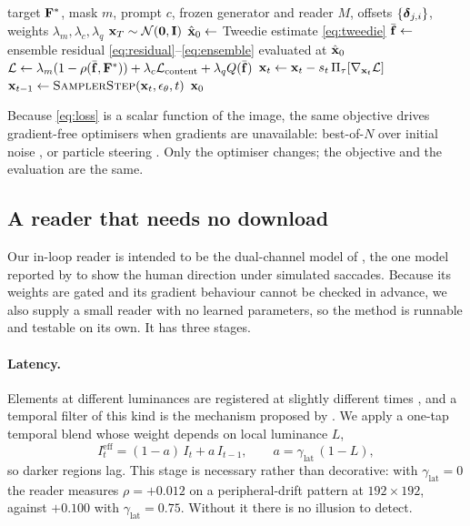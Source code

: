 \begin{algorithm}[t]
\caption{Jitter-ensemble motion guidance (one sample)}
\label{alg:main}
\begin{algorithmic}[1]
\Require target $\mathbf{F}^\ast$, mask $m$, prompt $c$, frozen generator and reader
         $M$, offsets $\{\boldsymbol{\delta}_{j,i}\}$, weights $\lambda_m,\lambda_c,\lambda_q$
\State $\mathbf{x}_T\sim\mathcal N(\mathbf 0,\mathbf I)$
  \State $\hat{\mathbf{x}}_0\gets$ Tweedie estimate \eqref{eq:tweedie}
    \State $\bar{\mathbf{f}}\gets$ ensemble residual \eqref{eq:residual}--\eqref{eq:ensemble}
           evaluated at $\hat{\mathbf{x}}_0$
    \State $\mathcal{L}\gets\lambda_m(1-\rho(\bar{\mathbf{f}},\mathbf{F}^\ast))
            +\lambda_c\mathcal{L}_{\text{content}}+\lambda_q Q(\bar{\mathbf{f}})$
    \State $\mathbf{x}_t\gets\mathbf{x}_t-s_t\,\Pi_\tau[\nabla_{\mathbf{x}_t}\mathcal{L}]$
  \EndIf
  \State $\mathbf{x}_{t-1}\gets\textsc{SamplerStep}(\mathbf{x}_t,\epsilon_\theta,t)$
\EndFor
\State \Return $\mathbf{x}_0$
\end{algorithmic}
\end{algorithm}

Because \eqref{eq:loss} is a scalar function of the image, the same objective
drives gradient-free optimisers when gradients are unavailable: best-of-$N$
over initial noise \cite{ma2025inferencescaling}, or particle steering
\cite{singhal2025fk}. Only the optimiser changes; the objective and the
evaluation are the same.

\subsection{A reader that needs no download}
\label{sec:reader}

Our in-loop reader is intended to be the dual-channel model of
\citet{sun2025multiorder}, the one model reported by
\citet{rosario2026illusory} to show the human direction under simulated
saccades. Because its weights are gated and its gradient behaviour cannot be
checked in advance, we also supply a small reader with no learned parameters,
so the method is runnable and testable on its own. It has three stages.

\paragraph{Latency.} Elements at different luminances are registered at
slightly different times \cite{conway2005neural,backus2005illusory}, and a
temporal filter of this kind is the mechanism proposed by
\citet{fermuller2010causal}. We apply a one-tap temporal blend whose weight
depends on local luminance $L$,
\begin{equation}
I^{\text{eff}}_t=(1-a)\,I_t+a\,I_{t-1},
\qquad a=\gamma_{\text{lat}}\,(1-L),
\label{eq:latency}
\end{equation}
so darker regions lag. This stage is necessary rather than decorative: with
$\gamma_{\text{lat}}=0$ the reader measures $\rho=+0.012$ on a
peripheral-drift pattern at $192\times192$, against $+0.100$ with
$\gamma_{\text{lat}}=0.75$. Without it there is no illusion to detect.

